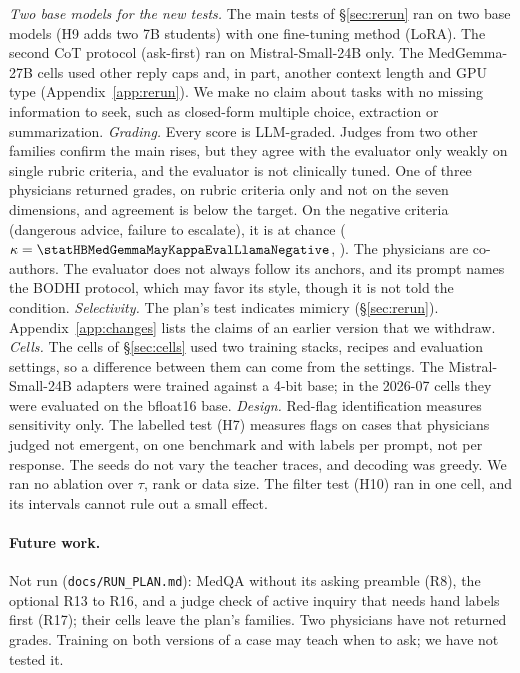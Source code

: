 \documentclass{article}
\newcommand{\bodhi}{BODHI}
\begin{document}
\emph{Two base models for the new tests.} The main tests of \S\ref{sec:rerun} ran on two base
models (H9 adds two 7B students) with one fine-tuning method (LoRA). The second CoT protocol (ask-first) ran on Mistral-Small-24B
only. The MedGemma-27B cells used other reply caps and, in part, another context length and GPU
type (Appendix~\ref{app:rerun}). We make no claim about
tasks with no missing information to seek, such as closed-form multiple choice, extraction or
summarization.
\emph{Grading.} Every score is LLM-graded. Judges from two other families confirm the main rises,
but they agree with the evaluator only weakly on single rubric criteria, and the evaluator is not
clinically tuned. One of three physicians returned grades, on rubric criteria only and
not on the seven dimensions, and agreement is below the target. On the negative criteria
(dangerous advice, failure to escalate), it is at chance ($\kappa =
\statHBMedGemmaMayKappaEvalLlamaNegative$, \statHBMedGemmaMayKappaEvalLlamaNegativeCI). The
physicians are co-authors. The evaluator does not always follow its anchors, and its prompt names
the \bodhi{} protocol, which may favor its style, though it is not told the condition.
\emph{Selectivity.} The plan's test indicates mimicry (\S\ref{sec:rerun}). Appendix~\ref{app:changes}
lists the claims of an earlier version that we withdraw.
\emph{Cells.} The cells of \S\ref{sec:cells} used two training stacks, recipes and evaluation
settings, so a difference between them can come from the settings. The Mistral-Small-24B adapters
were trained against a 4-bit base; in the 2026-07 cells they were evaluated on the bfloat16 base.
\emph{Design.} Red-flag identification measures sensitivity only. The labelled test (H7) measures
flags on cases that physicians judged not emergent, on one benchmark and with labels per prompt,
not per response. The seeds do not vary the teacher traces, and decoding was greedy. We ran no
ablation over $\tau$, rank or data size. The filter test (H10) ran in one cell, and its intervals
cannot rule out a small effect.

\paragraph{Future work.}\label{sec:future} Not run (\texttt{docs/RUN\_PLAN.md}): MedQA without
its asking preamble (R8), the optional R13 to R16, and a judge check of active inquiry that needs
hand labels first (R17); their cells leave the plan's families. Two physicians have not returned
grades. Training on both versions of a case may teach when to ask; we have not tested it.
\end{document}
